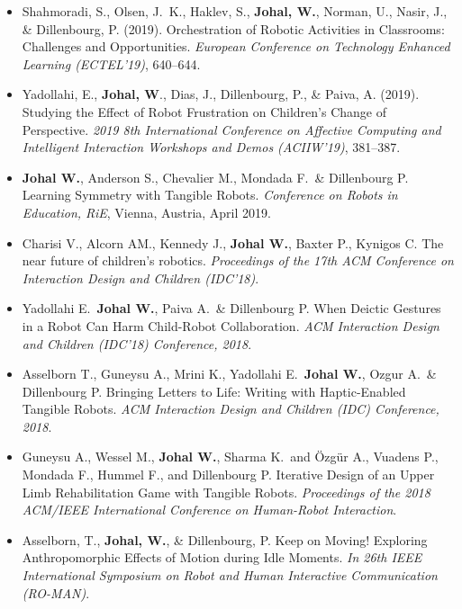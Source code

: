 \begin{itemize}[nosep]
    \item Shahmoradi, S., Olsen, J.\ K., Haklev, S., \textbf{Johal, W.}, Norman, U., Nasir, J., \& Dillenbourg, P. (2019). Orchestration of Robotic Activities in Classrooms: Challenges and Opportunities. \textit{European Conference on Technology Enhanced Learning (ECTEL'19)}, 640--644.

    \item Yadollahi, E., \textbf{Johal, W}., Dias, J., Dillenbourg, P., \& Paiva, A. (2019). Studying the Effect of Robot Frustration on Children's Change of Perspective. \textit{2019 8th International Conference on Affective Computing and Intelligent Interaction Workshops and Demos (ACIIW'19)}, 381--387.

    \item \textbf{Johal W.}, Anderson S., Chevalier M., Mondada F.\ \& Dillenbourg P. Learning Symmetry with Tangible Robots. \textit{Conference on Robots in Education, RiE}, Vienna, Austria, April 2019.

    \item Charisi V., Alcorn AM., Kennedy J., \textbf{Johal W.}, Baxter P., Kynigos C. The near future of children's robotics. \textit{Proceedings of the 17th ACM Conference on Interaction Design and Children (IDC'18)}.

    \item Yadollahi E.\ \textbf{Johal W.}, Paiva A.\ \& Dillenbourg P. When Deictic Gestures in a Robot Can Harm Child-Robot Collaboration. \textit{ACM Interaction Design and Children (IDC'18) Conference, 2018}. \faTrophy

    \item Asselborn T., Guneysu A., Mrini K., Yadollahi E.\ \textbf{Johal W.}, Ozgur A.\ \& Dillenbourg P. Bringing Letters to Life: Writing with Haptic-Enabled Tangible Robots. \textit{ACM Interaction Design and Children (IDC) Conference, 2018}.

    \item Guneysu A., Wessel M., \textbf{Johal W.}, Sharma K.\ and Özgür A., Vuadens P., Mondada F., Hummel F., and Dillenbourg P. Iterative Design of an Upper Limb Rehabilitation Game with Tangible Robots. \textit{Proceedings of the 2018 ACM/IEEE International Conference on Human-Robot Interaction}.

    \item Asselborn, T., \textbf{Johal, W.}, \& Dillenbourg, P. Keep on Moving! Exploring Anthropomorphic Effects of Motion during Idle Moments. \textit{In 26th IEEE International Symposium on Robot and Human Interactive Communication (RO-MAN)}.


\end{itemize}
